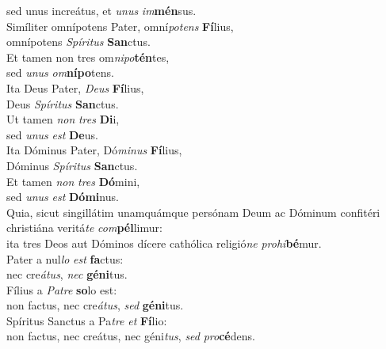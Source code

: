\evenverse sed unus increátus, et \textit{u}\textit{nus} \textit{im}\textbf{mén}sus.\\
\oddverse Simíliter omnípotens Pater, omní\textit{po}\textit{tens} \textbf{Fí}lius,~\*\\
\oddverse omnípotens \textit{Spí}\textit{ri}\textit{tus} \textbf{San}ctus.\\
\evenverse Et tamen non tres om\textit{ni}\textit{po}\textbf{tén}tes,~\*\\
\evenverse sed \textit{u}\textit{nus} \textit{om}\textbf{ní}\textbf{po}tens.\\
\oddverse Ita Deus Pater, \textit{De}\textit{us} \textbf{Fí}lius,~\*\\
\oddverse Deus \textit{Spí}\textit{ri}\textit{tus} \textbf{San}ctus.\\
\evenverse Ut tamen \textit{non} \textit{tres} \textbf{Di}i,~\*\\
\evenverse sed \textit{u}\textit{nus} \textit{est} \textbf{De}us.\\
\oddverse Ita Dóminus Pater, Dó\textit{mi}\textit{nus} \textbf{Fí}lius,~\*\\
\oddverse Dóminus \textit{Spí}\textit{ri}\textit{tus} \textbf{San}ctus.\\
\evenverse Et tamen \textit{non} \textit{tres} \textbf{Dó}mini,~\*\\
\evenverse sed \textit{u}\textit{nus} \textit{est} \textbf{Dó}\textbf{mi}nus.\\
\oddverse Quia, sicut singillátim unamquámque persónam Deum ac Dóminum confitéri christiána veritá\textit{te} \textit{com}\textbf{pél}limur:~\*\\
\oddverse ita tres Deos aut Dóminos dícere cathólica religió\textit{ne} \textit{pro}\textit{hi}\textbf{bé}mur.\\
\evenverse Pater a nul\textit{lo} \textit{est} \textbf{fa}ctus:~\*\\
\evenverse nec cre\textit{á}\textit{tus}, \textit{nec} \textbf{gé}\textbf{ni}tus.\\
\oddverse Fílius a \textit{Pa}\textit{tre} \textbf{so}lo est:~\*\\
\oddverse non factus, nec cre\textit{á}\textit{tus}, \textit{sed} \textbf{gé}\textbf{ni}tus.\\
\evenverse Spíritus Sanctus a Pa\textit{tre} \textit{et} \textbf{Fí}lio:~\*\\
\evenverse non factus, nec creátus, nec géni\textit{tus}, \textit{sed} \textit{pro}\textbf{cé}dens.\\
